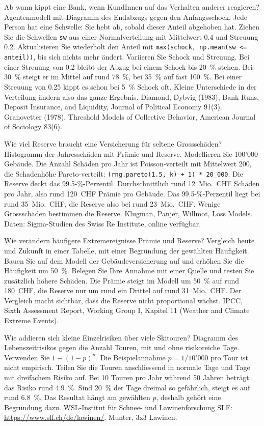 {Ab wann kippt eine Bank, wenn KundInnen auf das Verhalten anderer reagieren?}
{Agentenmodell mit Diagramm des Endabzugs gegen den Anfangsschock.}
{Jede Person hat eine Schwelle: Sie hebt ab, sobald dieser Anteil abgehoben hat. Ziehen Sie die Schwellen \texttt{sw} aus einer Normalverteilung mit Mittelwert 0.4 und Streuung 0.2. Aktualisieren Sie wiederholt den Anteil mit \texttt{max(schock, np.mean(sw <= anteil))}, bis sich nichts mehr ändert. Variieren Sie Schock und Streuung.}
{Bei einer Streuung von 0.2 bleibt der Abzug bei einem Schock bis 20~\% stehen. Bei 30~\% steigt er im Mittel auf rund 78~\%, bei 35~\% auf fast 100~\%. Bei einer Streuung von 0.25 kippt es schon bei 5~\% Schock oft. Kleine Unterschiede in der Verteilung ändern also das ganze Ergebnis.}
{Diamond, Dybvig (1983), Bank Runs, Deposit Insurance, and Liquidity, Journal of Political Economy 91(3). Granovetter (1978), Threshold Models of Collective Behavior, American Journal of Sociology 83(6).}

{Wie viel Reserve braucht eine Versicherung für seltene Grossschäden?}
{Histogramm der Jahresschäden mit Prämie und Reserve.}
{Modellieren Sie 100'000 Gebäude. Die Anzahl Schäden pro Jahr ist Poisson-verteilt mit Mittelwert 200, die Schadenhöhe Pareto-verteilt: \texttt{(rng.pareto(1.5, k) + 1) * 20\_000}. Die Reserve deckt das 99.5-\%-Perzentil.}
{Durchschnittlich rund 12~Mio.~CHF Schäden pro Jahr, also rund 120~CHF Prämie pro Gebäude. Das 99.5-\%-Perzentil liegt bei rund 35~Mio.~CHF, die Reserve also bei rund 23~Mio.~CHF. Wenige Grossschäden bestimmen die Reserve.}
{Klugman, Panjer, Willmot, Loss Models. Daten: Sigma-Studien des Swiss Re Institute, online verfügbar.}

{Wie verändern häufigere Extremereignisse Prämie und Reserve?}
{Vergleich heute und Zukunft in einer Tabelle, mit einer Begründung der gewählten Häufigkeit.}
{Bauen Sie auf dem Modell der Gebäudeversicherung auf und erhöhen Sie die Häufigkeit um 50~\%. Belegen Sie Ihre Annahme mit einer Quelle und testen Sie zusätzlich höhere Schäden.}
{Die Prämie steigt im Modell um 50~\% auf rund 180~CHF, die Reserve nur um rund ein Drittel auf rund 31~Mio.~CHF. Der Vergleich macht sichtbar, dass die Reserve nicht proportional wächst.}
{IPCC, Sixth Assessment Report, Working Group I, Kapitel 11 (Weather and Climate Extreme Events).}

{Wie addieren sich kleine Einzelrisiken über viele Skitouren?}
{Diagramm des Lebenszeitrisikos gegen die Anzahl Touren, mit und ohne risikoreiche Tage.}
{Verwenden Sie $1-(1-p)^n$. Die Beispielannahme $p = 1/10'000$ pro Tour ist nicht empirisch. Teilen Sie die Touren anschliessend in normale Tage und Tage mit dreifachem Risiko auf.}
{Bei 10 Touren pro Jahr während 50 Jahren beträgt das Risiko rund 4.9~\%. Sind 20~\% der Tage dreimal so gefährlich, steigt es auf rund 6.8~\%. Das Resultat hängt am gewählten $p$, deshalb gehört eine Begründung dazu.}
{WSL-Institut für Schnee- und Lawinenforschung SLF: \url{https://www.slf.ch/de/lawinen/}. Munter, 3x3 Lawinen.}

